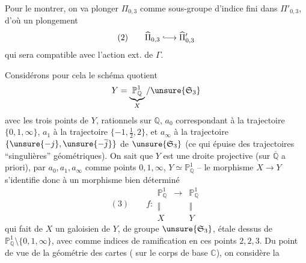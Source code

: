 Pour le montrer, on va plonger
$\Pi_{0,3}$ comme sous-groupe d'indice fini
dans $\Pi'_{0,3}$, d'où un plongement 
\[
(2)\qquad\widehat{\Pi}_{0,3}\lhook\joinrel\longrightarrow\widehat{\Pi}'_{0,3}
\]
qui sera compatible avec l'action ext. de $\Gamma$.


Considérons pour cela le schéma quotient
\[
Y=\underbrace{\mathbb P^1_{\mathbb Q}}_{X}/\unsure{\mathfrak S_3}
\]
avec les trois points  de $Y$, rationnels sur
$\mathbb Q$, $a_0$ correspondant à la trajectoire
 $\{0,1,\infty\}$, $a_1$ à la trajectoire
$\{-1,\frac12,2\}$, et $a_\infty$ à la trajectoire
$\{\unsure{-j},\unsure{-\overline j}\}$ de $\unsure{\mathfrak S_3}$
(ce qui épuise  des trajectoires
``singulières'' géométriques). On sait que $Y$ est une droite projective
(sur $\overline{\mathbb Q}$ a priori),   par
$a_0,a_1,a_\infty$ comme points $0,1,\infty$, 
$Y\simeq\mathbb P^1_{\mathbb Q}$ -- le  morphisme
$X\longrightarrow Y$ s'identifie donc à un morphisme bien déterminé
\[
(3)\qquad
f:\begin{array}{ccc}
\mathbb P^1_{\mathbb Q}&\longrightarrow&\mathbb P^1_{\mathbb Q}\\
\Vert&&\Vert\\
X&&Y
\end{array}
\]
qui fait de $X$ un  galoisien de $Y$, de groupe
$\unsure{\mathfrak S_3}$, étale  dessus de
$\mathbb P^1_{\mathbb Q}\setminus\{0,1,\infty\}$, avec comme indices de
ramification en ces points $2,2,3$. Du point de vue de la géométrie des cartes
( sur le corps de base $\mathbb C$), on considère la


